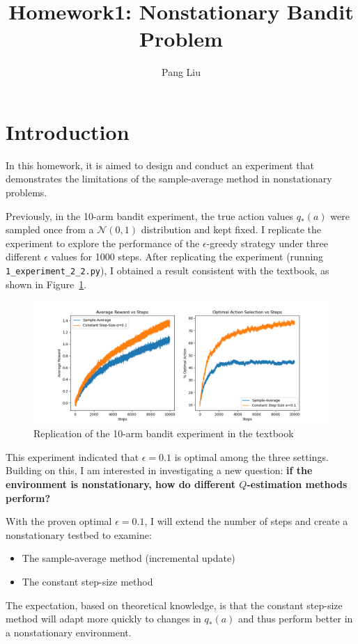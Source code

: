 \documentclass{article}
\title{Homework1: Nonstationary Bandit Problem}
\author{Pang Liu}
\begin{document}
\maketitle

\section{Introduction}

In this homework, it is aimed to design and conduct an experiment that demonstrates the limitations of the sample-average method in nonstationary problems. 

Previously, in the 10-arm bandit experiment, the true action values \( q_*(a) \) were sampled once from a \( \mathcal{N}(0, 1) \) distribution and kept fixed. I replicate the experiment to explore the performance of the \(\epsilon\)-greedy strategy under three different \(\epsilon\) values for 1000 steps. After replicating the experiment (running \texttt{1\_experiment\_2\_2.py}), I obtained a result consistent with the textbook, as shown in Figure~\ref{fig:1.1}.

\begin{figure}[h!]
\centering
\includegraphics[width=0.8\linewidth]{figure1.png} %
\caption{Replication of the 10-arm bandit experiment in the textbook}
\label{fig:1.1}
\end{figure}


This experiment indicated that \(\epsilon = 0.1\) is optimal among the three settings. Building on this, I am interested in investigating a new question: \textbf{if the environment is \textbf{nonstationary}, how do different \(Q\)-estimation methods perform? }

With the proven optimal \(\epsilon = 0.1\), I will extend the number of steps and create a nonstationary testbed to examine:
\begin{itemize}
    \item The sample-average method (incremental update)
    \item The constant step-size method
\end{itemize}
The expectation, based on theoretical knowledge, is that the constant step-size method will adapt more quickly to changes in \(q_*(a)\) and thus perform better in a nonstationary environment.
\end{document}
